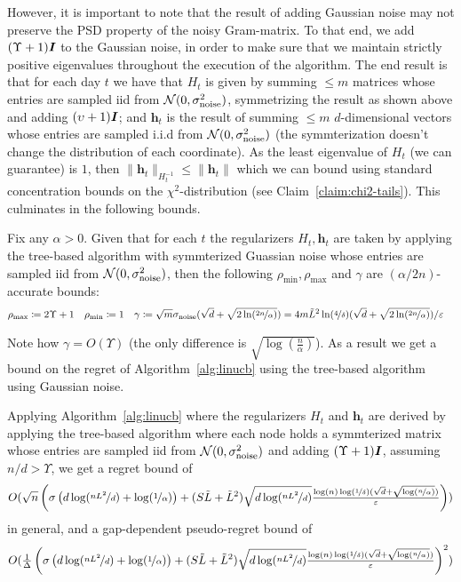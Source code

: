 \documentclass{article}
\renewcommand{\vec}[1]{\bm{#1}}
\newcommand{\defeq}{\coloneq}
\newcommand{\Normal}{\mathcal{N}}
\newcommand{\Eye}[1][]{\bm{I}\notblank{#1}{_{{#1}\times{#1}}}{}}
\begin{document}
However, it is important to note that the result of adding Gaussian noise may not preserve the PSD property of the noisy Gram-matrix. To that end, we add $(\Upsilon +1)\Eye$ to the Gaussian noise, in order to make sure that we maintain strictly positive eigenvalues throughout the execution of the algorithm. The end result is that for each day $t$ we have that $H_t$ is given by summing $\leq m$ matrices whose entries are sampled iid from $\Normal(0,\sigma_{\rm noise}^2)$, symmetrizing the result as shown above and adding $(\upsilon+1)\Eye$; and $\vec h_t$ is the result of summing $\leq m$ $d$-dimensional vectors whose entries are sampled i.i.d from $\Normal(0,\sigma_{\rm noise}^2)$ (the symmterization doesn't change the distribution of each coordinate). As the least eigenvalue of $H_t$ (we can guarantee) is $1$, then $\|\vec h_t\|_{H_t^{-1}} \leq \|\vec h_t\|$ which we can bound using standard concentration bounds on the $\chi^2$-distribution (see Claim~\ref{claim:chi2-tails}). This culminates in the following bounds.
\begin{proposition}
\label{pro:accurate_bounds_for_Gaussian}
Fix any $\alpha>0$. Given that for each $t$ the regularizers $H_t, \vec h_t$ are taken by applying the tree-based algorithm with symmterized Guassian noise whose entries are sampled iid from $\Normal(0, \sigma_{\rm noise}^2)$, then the following $\rho_{\min},\rho_{\max}$ and $\gamma$ are $(\alpha/2n)$-accurate bounds:
\begin{align*}
    &\rho_{\max}\defeq  2\Upsilon+1 &&\rho_{\min}\defeq 1 && \gamma \defeq \sqrt m\sigma_{\rm noise}(\sqrt d + \sqrt{2\ln(\nicefrac{2n}\alpha)})=4m\tilde L^2 \ln(\nicefrac 4 \delta) (\sqrt d + \sqrt{2\ln(\nicefrac{2n}\alpha)})/\varepsilon
  \end{align*}
\end{proposition}
Note how $\gamma=O(\Upsilon)$ (the only difference is $\sqrt{\log(\tfrac n \alpha)}$).
As a result we get a bound on the regret of Algorithm~\ref{alg:linucb} using the tree-based algorithm using Gaussian noise.
\begin{corollary}
\label{cor:regret_with_Wishart}
Applying Algorithm~\ref{alg:linucb} where the regularizers $H_t$ and $\vec h_t$ are derived by applying the tree-based algorithm where each node holds a symmterized matrix whose entries are sampled iid from $\Normal(0,\sigma_{\rm noise}^2)$ and adding $(\Upsilon+1)\Eye$, assuming $n/d>\Upsilon$, we get a regret bound of
\[O(\sqrt n \left(  \sigma\left(d\log(\nicefrac{nL^2}{d}) + \log(\nicefrac 1 \alpha) \right) + (S\tilde{L}+\tilde{L}^2)\sqrt{d\log(\nicefrac{nL^2}{d})}\tfrac{\log(n)\log(\nicefrac 1 \delta)(\sqrt d + \sqrt{\log(\nicefrac n \alpha)})}{\varepsilon}\right) )\]
in general, and a gap-dependent pseudo-regret bound of
\[O(\tfrac 1 \Delta \left(  \sigma\left(d\log(\nicefrac{nL^2}{d}) + \log(\nicefrac 1 \alpha) \right) + (S\tilde{L}+\tilde{L}^2)\sqrt{d\log(\nicefrac{nL^2}{d})}\tfrac{\log(n)\log(\nicefrac 1 \delta)(\sqrt d + \sqrt{\log(\nicefrac n \alpha)})}{\varepsilon}\right)^2 )\]
\end{corollary}
\end{document}
